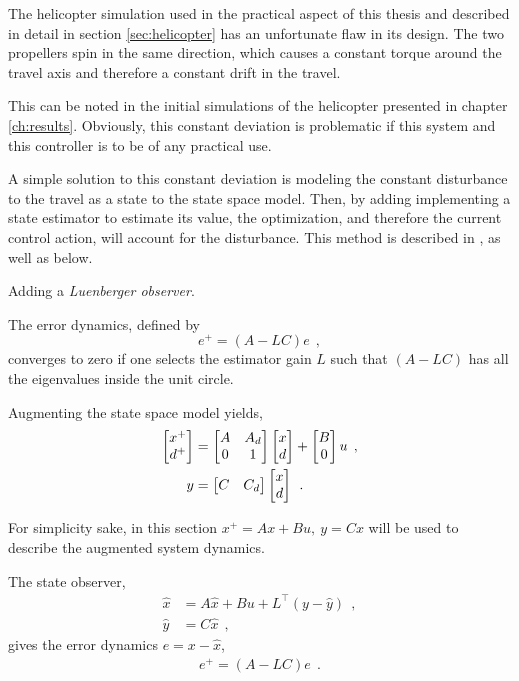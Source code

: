 The helicopter simulation used in the practical aspect of this thesis and described in detail in section \ref{sec:helicopter} has an unfortunate flaw in its design. The two propellers spin in the same direction, which causes a constant torque around the travel axis and therefore a constant drift in the travel. 

This can be noted in the initial simulations of the helicopter presented in chapter \ref{ch:results}. Obviously, this constant deviation is problematic if this system and this controller is to be of any practical use. 

A simple solution to this constant deviation is modeling the constant disturbance to the travel as a state to the state space model. Then, by adding implementing a state estimator to estimate its value, the optimization, and therefore the current control action, will account for the disturbance. This method is described in \cite{merging_opt_control}, as well as below. 

Adding a \textit{Luenberger observer}.

The error dynamics, defined by 
\begin{equation}
    e^+ = (A - LC) e \: \: ,
\end{equation}
converges to zero if one selects the estimator gain $L$ such that $(A-LC)$ has all the eigenvalues inside the unit circle.


Augmenting the state space model yields,
\begin{equation}
    \begin{split}
        \begin{bmatrix} x^+ \\  d^+\end{bmatrix} &= \begin{bmatrix}A & A_d \\ 0 & 1\end{bmatrix} \begin{bmatrix} x \\  d\end{bmatrix} + \begin{bmatrix}B \\ 0\end{bmatrix} u \: \:, \\
        y &= \begin{bmatrix}C & C_d\end{bmatrix} \begin{bmatrix}x \\ d\end{bmatrix} \: \: .
        \end{split}
\end{equation}

For simplicity sake, in this section $x^+ = Ax + Bu, \: y = Cx$ will be used to describe the augmented system dynamics.

The state observer,
\begin{equation}
    \begin{split}
        \hat x &= A \hat x + B u + L^\top ( y - \hat y) \: \: , \\
        \hat y &= C \hat x \: \: ,
    \end{split}
\end{equation}
gives the error dynamics $e = x - \hat x$,
\begin{equation}
    \begin{split}
        e^+ = (A - LC) e \: \: .
    \end{split}
\end{equation}

